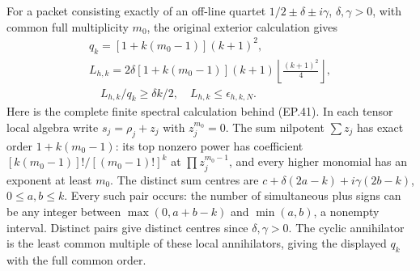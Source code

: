 \documentclass[11pt]{article}
\begin{document}
For a packet consisting exactly of an off-line quartet
$1/2\pm\delta\pm i\gamma$, $\delta,\gamma>0$, with common full
multiplicity $m_0$, the original exterior calculation gives
\[
 \begin{gathered}
 q_k=[1+k(m_0-1)](k+1)^2,\\
 L_{h,k}=2\delta[1+k(m_0-1)](k+1)
       \left\lfloor\frac{(k+1)^2}{4}\right\rfloor,\\
 \quad L_{h,k}/q_k\ge\delta k/2,
 \quad L_{h,k}\le\epsilon_{h,k,N}.
 \end{gathered}\tag{EP.41}
\]
Here is the complete finite spectral calculation behind (EP.41).
In each tensor local algebra write $s_j=\rho_j+z_j$ with
$z_j^{m_0}=0$. The sum nilpotent $\sum z_j$ has exact order
$1+k(m_0-1)$: its top nonzero power has coefficient
$[k(m_0-1)]!/[(m_0-1)!]^k$ at $\prod z_j^{m_0-1}$, and every
higher monomial has an exponent at least $m_0$.
The distinct sum centres are
$c+\delta(2a-k)+i\gamma(2b-k)$, $0\le a,b\le k$.
Every such pair occurs: the number of simultaneous plus signs can
be any integer between $\max(0,a+b-k)$ and $\min(a,b)$, a nonempty
interval. Distinct pairs give distinct centres since $\delta,\gamma>0$.
The cyclic annihilator is the least common multiple of these local
annihilators, giving the displayed $q_k$ with the full common order.
\end{document}
